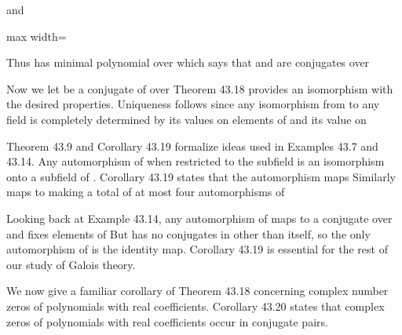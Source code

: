 \documentclass[11pt,oneside]{article}
\begin{document}
\begin{BookBody}
\noindent and

\begin{center}\begin{adjustbox}{max width=\linewidth}\end{adjustbox}\end{center}

\noindent Thus \BookInline{\beta = \psi (\alpha )} has minimal polynomial  over  which says that \BookInline{\alpha } and \BookInline{\beta } are conjugates over 

Now we let  be a conjugate of \BookInline{\alpha } over  Theorem 43.18 provides an isomorphism  with the desired properties. Uniqueness follows since any isomorphism from  to any field is completely determined by its values on elements of  and its value on \BookEnd{\blacklozenge}

Theorem 43.9 and Corollary 43.19 formalize ideas used in Examples 43.7 and 43.14. Any automorphism \BookInline{\sigma } of  when restricted to the subfield  is an isomorphism onto a subfield of . Corollary 43.19 states that the automorphism maps  Similarly  maps to  making a total of at most four automorphisms of 

Looking back at Example 43.14, any automorphism of  maps  to a conjugate over  and fixes elements of  But  has no conjugates in  other than itself, so the only automorphism of  is the identity map. Corollary 43.19 is essential for the rest of our study of Galois theory.

We now give a familiar corollary of Theorem 43.18 concerning complex number zeros of polynomials with real coefficients. Corollary 43.20 states that complex zeros of polynomials with real coefficients occur in conjugate pairs.

\end{BookBody}
\end{document}

